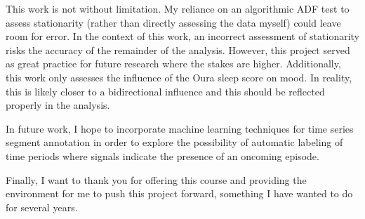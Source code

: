 \documentclass{article}
\begin{document}
This work is not without limitation. My reliance on an algorithmic ADF test to
assess stationarity (rather than directly assessing the data myself) could leave
room for error. In the context of this work, an incorrect assessment of
stationarity risks the accuracy of the remainder of the analysis. However, this
project served as great practice for future research where the stakes are
higher. Additionally, this work only assesses the influence of the Oura sleep
score on mood. In reality, this is likely closer to a bidirectional influence
and this should be reflected properly in the analysis. 

In future work, I hope to incorporate machine learning techniques for time
series segment annotation in order to explore the possibility of automatic
labeling of time periods where signals indicate the presence of an oncoming
episode.

Finally, I want to thank you for offering this course and providing the environment for
me to push this project forward, something I have wanted to do for several
years.

\pagebreak


\end{document}
